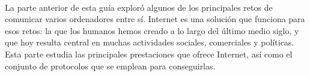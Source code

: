 \ \\[-10cm]
La parte anterior de esta guía exploró algunos de los principales retos de comunicar varios ordenadores entre sí.
Internet es una solución que funciona para esos retos: la que los humanos hemos creado a lo largo del último medio siglo,
y que hoy resulta central en muchas actividades sociales, comerciales y políticas.
%
Esta parte estudia las principales prestaciones que ofrece Internet, así como el conjunto de protocolos
que se emplean para conseguirlas.
